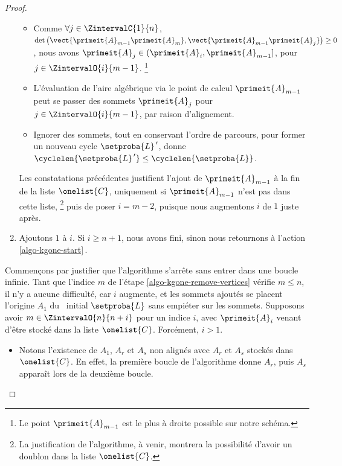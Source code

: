 \begin{proof}
\begin{enumerate}[label=\fbox{\small\bfseries\textsf{A\kern.25pt\arabic*}}]
\begin{itemize}
            \item Comme
            $\forall j \in \ZintervalC{1}{n}$,
            $\det \big( \vect{\primeit{A}_{m-1} \primeit{A}_m}, \vect{\primeit{A}_{m-1} \primeit{A}_{j}} \big) \geq 0$,
            nous avons
            $\primeit{A}_{j} \in ( \primeit{A}_i , \primeit{A}_{m-1} ]$,
            pour $j \in \ZintervalO{i}{m-1}$.%
            \footnote{
                Le point $\primeit{A}_{m-1}$ est le plus à droite possible sur notre schéma.
            }

            \item L'évaluation de l'aire algébrique via le point de calcul $\primeit{A}_{m-1}$ peut se passer des sommets $\primeit{A}_j$ pour $j \in \ZintervalO{i}{m-1}$, par raison d'alignement.

            \item Ignorer des sommets, tout en conservant l'ordre de parcours, pour former un nouveau cycle $\setproba{L}^{\,\prime}$, donne $\cyclelen{\setproba{L}^{\,\prime}} \leq \cyclelen{\setproba{L}} $.
        \end{itemize}

        \noindent
        Les constatations précédentes justifient l'ajout de
        $\primeit{A}_{m-1}$ à la fin de la liste $\onelist{C}$, uniquement si $\primeit{A}_{m-1}$ n'est pas dans cette liste,%
        \footnote{
            La justification de l'algorithme, à venir, montrera la possibilité d'avoir un doublon dans la liste $\onelist{C}$.
        }
        puis de poser $i = m - 2$, puisque nous augmentons $i$ de $1$ juste après.


        \item \label{algo-kgone-loop-back}
        Ajoutons $1$ à $i$.
        Si $i \geq n+1$, nous avons fini, sinon nous retournons à l'action \ref{algo-kgone-start}\,.
    \end{enumerate}


    \medskip


    Commençons par justifier que l'algorithme s'arrête sans entrer dans une boucle infinie.
    Tant que l'indice $m$ de l'étape \ref{algo-kgone-remove-vertices} vérifie $m \leq n$, il n'y a aucune difficulté, car $i$ augmente, et les sommets ajoutés se placent  l'origine $A_1$ du \ncycle\ initial $\setproba{L}$ sans empiéter sur les  sommets.
    Supposons avoir $m \in \ZintervalO{n}{n+i}$ pour un indice $i$, avec $\primeit{A}_i$ venant d'être stocké dans la liste $\onelist{C}$.
    Forcément, $i > 1$.
    \begin{itemize}
        \item Notons l'existence de $A_1$, $A_r$ et $A_s$ non alignés avec $A_r$ et $A_s$ stockés dans $\onelist{C}$.
        En effet,
        la première boucle de l'algorithme donne $A_r$, puis $A_s$ apparaît lors de la deuxième boucle.



\end{itemize}
\end{proof}
